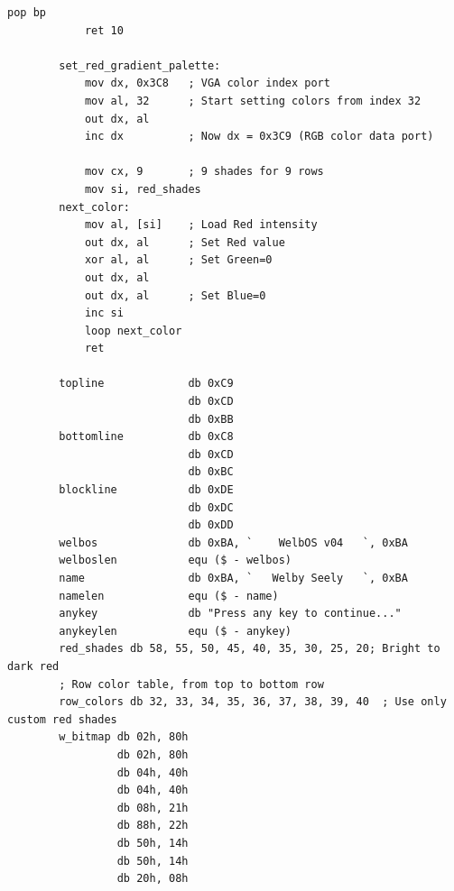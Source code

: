 \documentclass{article}
\begin{document}
\begin{lstlisting}[caption={loaderV04.asm listing}, captionpos=t]
            pop bp
            ret 10

        set_red_gradient_palette:
            mov dx, 0x3C8   ; VGA color index port
            mov al, 32      ; Start setting colors from index 32
            out dx, al
            inc dx          ; Now dx = 0x3C9 (RGB color data port)

            mov cx, 9       ; 9 shades for 9 rows
            mov si, red_shades
        next_color:
            mov al, [si]    ; Load Red intensity
            out dx, al      ; Set Red value
            xor al, al      ; Set Green=0
            out dx, al
            out dx, al      ; Set Blue=0
            inc si
            loop next_color
            ret

        topline             db 0xC9
                            db 0xCD
                            db 0xBB
        bottomline          db 0xC8
                            db 0xCD
                            db 0xBC
        blockline           db 0xDE
                            db 0xDC
                            db 0xDD
        welbos              db 0xBA, `    WelbOS v04   `, 0xBA
        welboslen           equ ($ - welbos)
        name                db 0xBA, `   Welby Seely   `, 0xBA
        namelen             equ ($ - name)
        anykey              db "Press any key to continue..."
        anykeylen           equ ($ - anykey)
        red_shades db 58, 55, 50, 45, 40, 35, 30, 25, 20; Bright to dark red
        ; Row color table, from top to bottom row
        row_colors db 32, 33, 34, 35, 36, 37, 38, 39, 40  ; Use only custom red shades
        w_bitmap db 02h, 80h
                 db 02h, 80h
                 db 04h, 40h
                 db 04h, 40h
                 db 08h, 21h
                 db 88h, 22h
                 db 50h, 14h
                 db 50h, 14h
                 db 20h, 08h

    \end{lstlisting}
\end{document}
